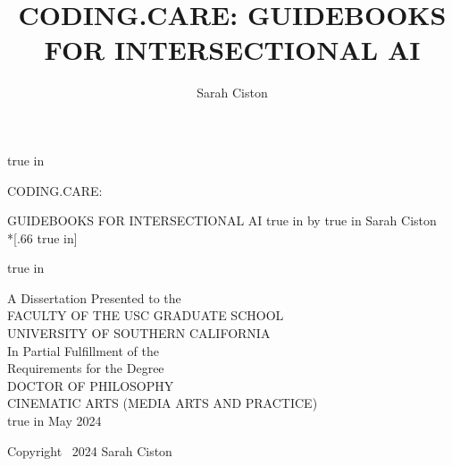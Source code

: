\documentclass[11pt,oneside]{scrbook} %
\title{CODING.CARE: GUIDEBOOKS FOR INTERSECTIONAL AI}
\author{Sarah Ciston}
\begin{document}
{}%
\pagestyle{empty}%
\begin{singlespace}%
    \hypersetup{hidelinks}
  \large  %
    \setcounter{page}{0}%
    \null
     true in
    \begin{center} 
    \begin{doublespace}
        CODING.CARE: \par
        GUIDEBOOKS FOR INTERSECTIONAL AI
       true in
      by%
       true in
      Sarah Ciston\\*[.66 true in]%
      \par
       true in
    \end{doublespace}
      A Dissertation Presented to the\\%
      FACULTY OF THE USC GRADUATE SCHOOL\\%
      UNIVERSITY OF SOUTHERN CALIFORNIA\\%
      In Partial Fulfillment of the\\%
      Requirements for the Degree\\%
      DOCTOR OF PHILOSOPHY\\%
      CINEMATIC ARTS (MEDIA ARTS AND PRACTICE)\\%
       true in
      May 2024%
    \end{center}%
    \par
    \vfill
          \noindent Copyright~ 2024 \hfill Sarah Ciston
    \end{singlespace}
    \setcounter{page}{1}
\end{document}
